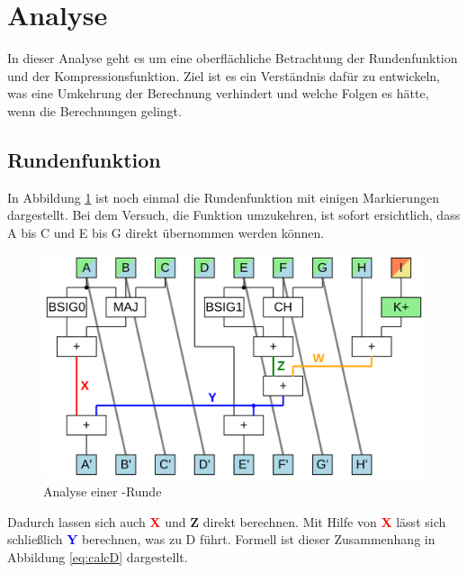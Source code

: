\section{Analyse}
\label{sec:sha256:analyse}

In dieser Analyse geht es um eine oberflächliche Betrachtung der Rundenfunktion und der Kompressionsfunktion.
Ziel ist es ein Verständnis dafür zu entwickeln, was eine Umkehrung der Berechnung verhindert und welche Folgen es
hätte, wenn die Berechnungen gelingt.

\subsection{Rundenfunktion}
In Abbildung \ref{fig:sha256coreA} ist noch einmal die Rundenfunktion mit einigen Markierungen dargestellt.
Bei dem Versuch, die Funktion umzukehren, ist sofort ersichtlich, dass A bis C und E bis G direkt übernommen werden können.

\begin{figure}[!h]
  \centering
  \includegraphics[scale=0.4]{images/sha256coreA}
  \caption{Analyse einer -Runde}
  \label{fig:sha256coreA}
\end{figure}

Dadurch lassen sich auch \textcolor{red}{\textbf{X}} und \textcolor{Strong Green}{\textbf{Z}} direkt berechnen.
Mit Hilfe von \textcolor{red}{\textbf{X}} lässt sich schließlich \textcolor{blue}{\textbf{Y}} berechnen, was zu D führt.
Formell ist dieser Zusammenhang in Abbildung \ref{eq:calcD} dargestellt.

